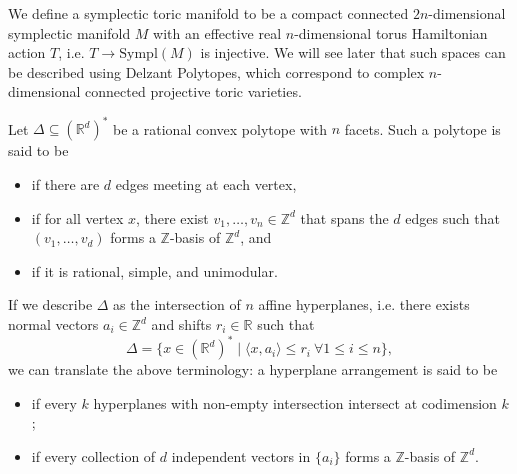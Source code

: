 \documentclass[b5paper]{article}
\newcommand{\Sympl}{\mathrm{Sympl}}
\begin{document}
We define a symplectic toric manifold to be a compact connected $2n$-dimensional symplectic manifold $M$ with an effective real $n$-dimensional torus Hamiltonian action $T$, i.e. $T \to \Sympl(M)$ is injective.
We will see later that such spaces can be described using Delzant Polytopes, which correspond to complex $n$-dimensional connected projective toric varieties.

Let $\Delta \subseteq (\mathbb{R}^d)^*$ be a rational convex polytope with $n$ facets.
Such a polytope is said to be
\begin{itemize}
    \item {} if there are $d$ edges meeting at each vertex,
    \item {} if for all vertex $x$, there exist $v_1, \dots, v_n \in \mathbb{Z}^d$ that spans the $d$ edges such that $(v_1, \dots, v_d)$ forms a $\mathbb{Z}$-basis of $\mathbb{Z}^d$, and
    \item {} if it is rational, simple, and unimodular.
\end{itemize}
If we describe $\Delta$ as the intersection of $n$ affine hyperplanes, i.e. there exists normal vectors $a_i\in \mathbb{Z}^d$ and shifts $r_i\in\mathbb{R}$ such that 
\begin{equation*}
    \Delta = \{ x \in (\mathbb{R}^d)^* \mid \langle x, a_i \rangle \leq r_i \  \forall 1 \leq i \leq n \},
\end{equation*}
we can translate the above terminology: a hyperplane arrangement is said to be
\begin{itemize}
    \item {} if every $k$ hyperplanes with non-empty intersection intersect at codimension $k$;
    \item {} if every collection of $d$ independent vectors in $\{a_i\}$ forms a $\mathbb{Z}$-basis of $\mathbb{Z}^d$.
\end{itemize}
\end{document}
